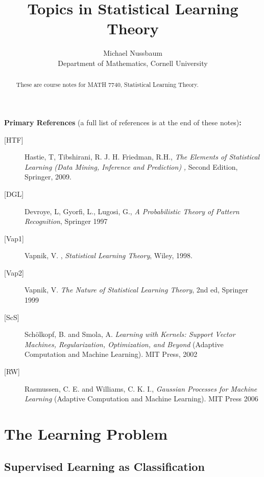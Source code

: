 \documentclass[11pt,twoside]{article}%
\theoremstyle{change}
\begin{document}
\title{Topics in Statistical Learning Theory}
\author{Michael Nussbaum\\{\small Department of Mathematics, Cornell University}}
\maketitle

\begin{abstract}
These are course notes for MATH 7740, Statistical Learning Theory.

\end{abstract}
\tableofcontents

\setcounter{tocdepth}{2} \newpage

\textbf{Primary References }(a full list of references is at the end of these
notes)\textbf{:}

\begin{description}
\item[{[HTF]}] Hastie, T, Tibshirani, R. J. H. Friedman, R.H., \textsl{The
Elements of Statistical Learning (Data Mining, Inference and Prediction)}%
\textit{, }Second Edition, Springer, 2009.

\item[{[DGL]}] Devroye, L, Gyorfi, L., Lugosi, G., \textsl{A Probabilistic
Theory of Pattern Recognition}, Springer 1997

\item[{[Vap1]}] Vapnik, V. , \textsl{Statistical Learning Theory}, Wiley, 1998.

\item[{[Vap2]}] Vapnik, V. \textsl{The Nature of Statistical Learning Theory},
2nd ed, Springer 1999

\item[{[ScS]}] Sch\"{o}lkopf, B. and Smola, A. \textsl{Learning with Kernels:
Support Vector Machines, Regularization, Optimization, and Beyond} (Adaptive
Computation and Machine Learning). MIT Press, 2002

\item[{[RW]}] Rasmussen, C. E. and Williams, C. K. I., \textsl{Gaussian
Processes for Machine Learning} (Adaptive Computation and Machine Learning).
MIT Press 2006
\end{description}

\section{The Learning Problem}

\subsection{Supervised Learning as Classification}
\end{document}
